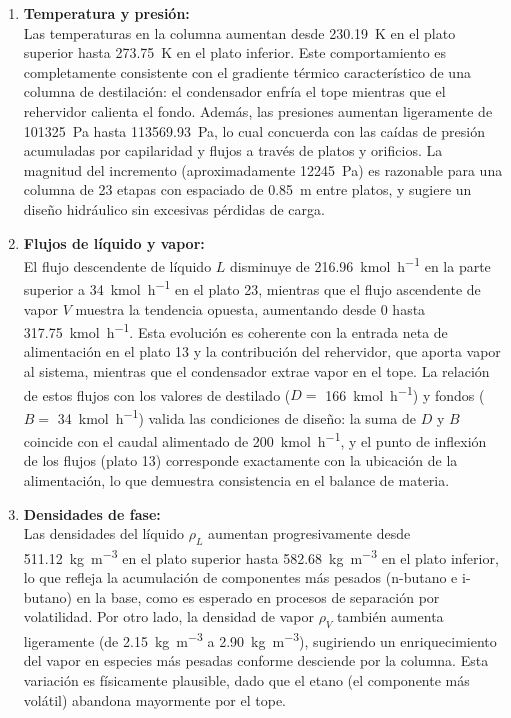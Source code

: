 \begin{enumerate}
    \item \textbf{Temperatura y presión:}\\
          Las temperaturas en la columna aumentan desde \SI{230.19}{\kelvin} en el plato superior hasta \SI{273.75}{\kelvin} en el plato inferior. Este comportamiento es completamente consistente con el gradiente térmico característico de una columna de destilación: el condensador enfría el tope mientras que el rehervidor calienta el fondo. Además, las presiones aumentan ligeramente de \SI{101325}{\pascal} hasta \SI{113569.93}{\pascal}, lo cual concuerda con las caídas de presión acumuladas por capilaridad y flujos a través de platos y orificios. La magnitud del incremento (aproximadamente \SI{12245}{\pascal}) es razonable para una columna de 23 etapas con espaciado de \SI{0.85}{m} entre platos, y sugiere un diseño hidráulico sin excesivas pérdidas de carga.

    \item \textbf{Flujos de líquido y vapor:}\\
          El flujo descendente de líquido $L$ disminuye de \SI{216.96}{\kilo\mole\per\hour} en la parte superior a \SI{34}{\kilo\mole\per\hour} en el plato 23, mientras que el flujo ascendente de vapor $V$ muestra la tendencia opuesta, aumentando desde 0 hasta \SI{317.75}{\kilo\mole\per\hour}. Esta evolución es coherente con la entrada neta de alimentación en el plato 13 y la contribución del rehervidor, que aporta vapor al sistema, mientras que el condensador extrae vapor en el tope. La relación de estos flujos con los valores de destilado ($D=$ \SI{166}{\kilo\mole\per\hour}) y fondos ($B=$ \SI{34}{\kilo\mole\per\hour}) valida las condiciones de diseño: la suma de $D$ y $B$ coincide con el caudal alimentado de \SI{200}{\kilo\mole\per\hour}, y el punto de inflexión de los flujos (plato 13) corresponde exactamente con la ubicación de la alimentación, lo que demuestra consistencia en el balance de materia.

          \newpage
    \item \textbf{Densidades de fase:}\\
          Las densidades del líquido $\rho_L$ aumentan progresivamente desde \SI{511.12}{\kilogram\per\cubic\meter} en el plato superior hasta \SI{582.68}{\kilogram\per\cubic\meter} en el plato inferior, lo que refleja la acumulación de componentes más pesados (n-butano e i-butano) en la base, como es esperado en procesos de separación por volatilidad. Por otro lado, la densidad de vapor $\rho_V$ también aumenta ligeramente (de \SI{2.15}{\kilogram\per\cubic\meter} a \SI{2.90}{\kilogram\per\cubic\meter}), sugiriendo un enriquecimiento del vapor en especies más pesadas conforme desciende por la columna. Esta variación es físicamente plausible, dado que el etano (el componente más volátil) abandona mayormente por el tope.


\end{enumerate}

